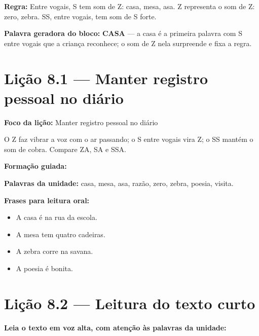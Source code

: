 \textbf{Regra:} Entre vogais, S tem som de Z: casa, mesa, asa. Z representa o som de Z: zero, zebra. SS, entre vogais, tem som de S forte.

\textbf{Palavra geradora do bloco:} \textbf{CASA} --- a casa é a primeira palavra com S entre vogais que a criança reconhece; o som de Z nela surpreende e fixa a regra.

\section{Lição 8.1 --- Manter registro pessoal no diário}

\textbf{Foco da lição:} Manter registro pessoal no diário


\begin{boquinha}
O Z faz vibrar a voz com o ar passando; o S entre vogais vira Z; o SS mantém o som de cobra. Compare ZA, SA e SSA.
\end{boquinha}

\noindent\textbf{Formação guiada:}

\begin{center}
\end{center}

\noindent\textbf{Palavras da unidade:} casa, mesa, asa, razão, zero, zebra, poesia, visita.

\noindent\textbf{Frases para leitura oral:}
\begin{itemize}[leftmargin=1.6em]
  \item A casa é na rua da escola.
  \item A mesa tem quatro cadeiras.
  \item A zebra corre na savana.
  \item A poesia é bonita.
\end{itemize}

\section{Lição 8.2 --- Leitura do texto curto}

\noindent\textbf{Leia o texto em voz alta, com atenção às palavras da unidade:}


